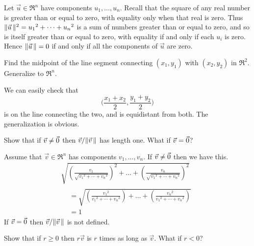\begin{exercises}
\begin{answer}
      Let \( \vec{u}\in\Re^n \) have components \( u_1,\ldots,u_n \).
      Recall that the square of any real number is greater than or equal to
      zero, with equality only when that real is zero.
      Thus
      \( \|\vec{u}\,\|^2={u_1}^2+\cdots+{u_n}^2 \) is a sum of numbers
      greater than or equal to zero, and so is itself greater than or equal
      to zero, with equality if and only if each \( u_i \) is zero.
      Hence \( \|\vec{u}\,\|=0 \) if and only if all the components of
      \( \vec{u} \) are zero.    
    \end{answer}
  \recommended \item 
    Find the midpoint of the line segment connecting
    \( (x_1,y_1) \) with \( (x_2,y_2) \) in \( \Re^2 \).
    Generalize to \( \Re^n \).
    \begin{answer}
      We can easily check that
      \begin{equation*}
        \bigl( \frac{x_1+x_2}{2},\frac{y_1+y_2}{2}  \bigr)
      \end{equation*}
      is on the line connecting the two, and is equidistant from both.
      The generalization is obvious.  
    \end{answer}
  \item 
    Show that if \( \vec{v}\neq\vec{0} \) then
    \( \vec{v}/\|\vec{v}\,\| \) has length one.
    What if \( \vec{v}=\vec{0} \)?
    \begin{answer}
      Assume that \( \vec{v}\in\Re^n \) has components \( v_1,\ldots,v_n \).
      If \( \vec{v}\neq \vec{0} \) then we have this.
      \begin{multline*}
        \sqrt{\left(\frac{v_1}{\sqrt{{v_1}^2+\cdots+{v_n}^2}}\right)^2+
              \dots+\left(\frac{v_n}{\sqrt{{v_1}^2+\cdots+{v_n}^2}}\right)^2}
        \\
        \begin{aligned}
          &=\sqrt{\left(\frac{{v_1}^2}{{v_1}^2+\cdots+{v_n}^2}\right)+
              \dots+\left(\frac{{v_n}^2}{{v_1}^2+\cdots+{v_n}^2}\right)}   \\
          &=1
        \end{aligned}
      \end{multline*}
      If \( \vec{v}=\vec{0} \) then \( \vec{v}/\|\vec{v}\,\| \) is not
      defined.
    \end{answer}
  \item 
     Show that if \( r\geq 0 \) then
     \( r\vec{v} \) is \( r \) times as long
     as \( \vec{v} \).
     What if \( r< 0 \)?
    \begin{answer}

\end{answer}
\end{exercises}
